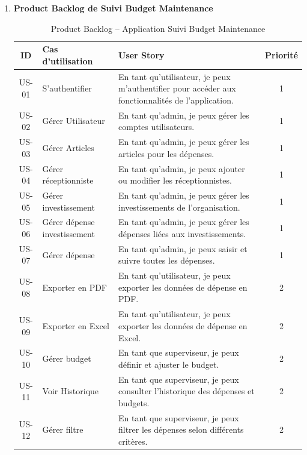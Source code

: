 \documentclass[11pt,a4paper]{article}
\begin{document}
\begin{enumerate}
\newpage
\item \textbf{Product Backlog de Suivi Budget Maintenance}
\begin{table}[H]
\centering
\begin{tabular}{|c|p{5cm}|p{7cm}|c|}
\hline
\textbf{ID} & \textbf{Cas d’utilisation} & \textbf{User Story} & \textbf{Priorité} \\
\hline
US-01 & S’authentifier & En tant qu’utilisateur, je peux m’authentifier pour accéder aux fonctionnalités de l’application. & 1 \\
\hline
US-02 & Gérer Utilisateur & En tant qu’admin, je peux gérer les comptes utilisateurs. & 1 \\
\hline
US-03 & Gérer Articles & En tant qu’admin, je peux gérer les articles pour les dépenses. & 1 \\
\hline
US-04 & Gérer réceptionniste & En tant qu’admin, je peux ajouter ou modifier les réceptionnistes. & 1 \\
\hline
US-05 & Gérer investissement & En tant qu’admin, je peux gérer les investissements de l’organisation. & 1 \\
\hline
US-06 & Gérer dépense investissement & En tant qu’admin, je peux gérer les dépenses liées aux investissements. & 1 \\
\hline	
US-07 & Gérer dépense & En tant qu’admin, je peux saisir et suivre toutes les dépenses. & 1 \\
\hline
US-08 & Exporter en PDF & En tant qu’utilisateur, je peux exporter les données de dépense en PDF. & 2 \\
\hline
US-09 & Exporter en Excel & En tant qu’utilisateur, je peux exporter les données de dépense en Excel. & 2 \\
\hline
US-10 & Gérer budget & En tant que superviseur, je peux définir et ajuster le budget. & 2 \\
\hline
US-11 & Voir Historique & En tant que superviseur, je peux consulter l’historique des dépenses et budgets. & 2 \\
\hline
US-12 & Gérer filtre & En tant que superviseur, je peux filtrer les dépenses selon différents critères. & 2 \\
\hline
\end{tabular}
\caption{Product Backlog – Application Suivi Budget Maintenance}
\end{table}


\end{enumerate}
\end{document}
